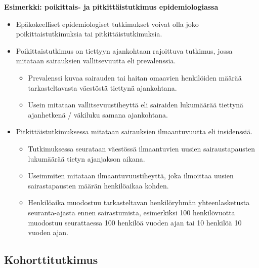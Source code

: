 \documentclass[
]{book}
\providecommand{\tightlist}{%
  \setlength{\itemsep}{0pt}\setlength{\parskip}{0pt}}
\begin{document}
\newpage

\begin{eblock}{}

\textbf{Esimerkki: poikittais- ja pitkittäistutkimus epidemiologiassa}

\begin{itemize}
\tightlist
\item
  Epäkokeelliset epidemiologiset tutkimukset voivat olla joko poikittaistutkimuksia tai pitkittäistutkimuksia.
\item
  Poikittaistutkimus on tiettyyn ajankohtaan rajoittuva tutkimus, jossa mitataan sairauksien vallitsevuutta eli prevalenssia.

  \begin{itemize}
  \tightlist
  \item
    Prevalenssi kuvaa sairauden tai haitan omaavien henkilöiden määrää tarkasteltavasta väestöstä tiettynä ajankohtana.
  \item
    Usein mitataan vallitsevuustiheyttä eli sairaiden lukumäärää tiettynä ajanhetkenä / väkiluku samana ajankohtana.
  \end{itemize}
\item
  Pitkittäistutkimuksessa mitataan sairauksien ilmaantuvuutta eli insidenssiä.

  \begin{itemize}
  \tightlist
  \item
    Tutkimuksessa seurataan väestössä ilmaantuvien uusien sairaustapausten lukumäärää tietyn ajanjakson aikana.
  \item
    Useimmiten mitataan ilmaantuvuustiheyttä, joka ilmoittaa uusien sairastapausten määrän henkilöaikaa kohden.
  \item
    Henkilöaika muodostuu tarkasteltavan henkilöryhmän yhteenlasketusta seuranta-ajasta ennen sairastumista, esimerkiksi 100 henkilövuotta muodostuu seurattaessa 100 henkilöä vuoden ajan tai 10 henkilöä 10 vuoden ajan.
  \end{itemize}
\end{itemize}

\end{eblock}

\hfill\break

\hypertarget{kohorttitutkimus}{%
\subsection{\texorpdfstring{\textbf{Kohorttitutkimus}}{Kohorttitutkimus}}\label{kohorttitutkimus}}
\end{document}
